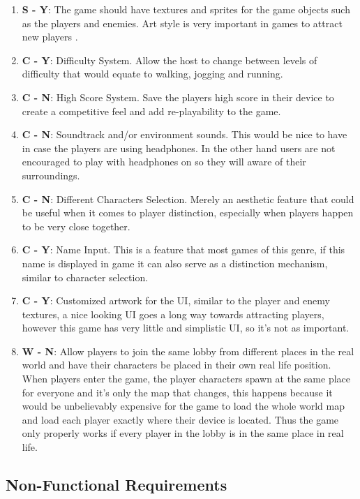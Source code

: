 \documentclass{dissertation}
\begin{document}
\begin{enumerate}
\item \textbf{S - Y}: The game should have textures and sprites for the game objects such as the players and enemies. Art style is very important in games to attract new players \citep{Solarski13}.
\item \textbf{C - Y}: Difficulty System. Allow the host to change between levels of difficulty that would equate to walking, jogging and running.
\item \textbf{C - N}: High Score System. Save the players high score in their device to create a competitive feel and add re-playability to the game.
\item \textbf{C - N}: Soundtrack and/or environment sounds. This would be nice to have in case the players are using headphones. In the other hand users are not encouraged to play 
with headphones on so they will aware of their surroundings.
\item \textbf{C - N}: Different Characters Selection. Merely an aesthetic feature that could be useful when it comes to player distinction, especially when players happen to be very close together.
\item \textbf{C - Y}: Name Input. This is a feature that most games of this genre, if this name is displayed in game it can also serve as a distinction mechanism, similar to character 
selection.
\item \textbf{C - Y}: Customized artwork for the UI, similar to the player and enemy textures, a nice looking UI goes a long way towards attracting players, however this game has very little 
and simplistic UI, so it's not as important.
\item \textbf{W - N}: Allow players to join the same lobby from different places in the real world and have their characters be placed in their own real life position. When players enter the game, the player characters spawn at the same place for everyone and it's only the map that changes, this happens because it would be unbelievably expensive for the game to load the whole world map and load each player exactly where their device is located. Thus the game only properly works if every player in the lobby is in the same place in real life.
\end{enumerate}

\subsection{Non-Functional Requirements}
\end{document}
